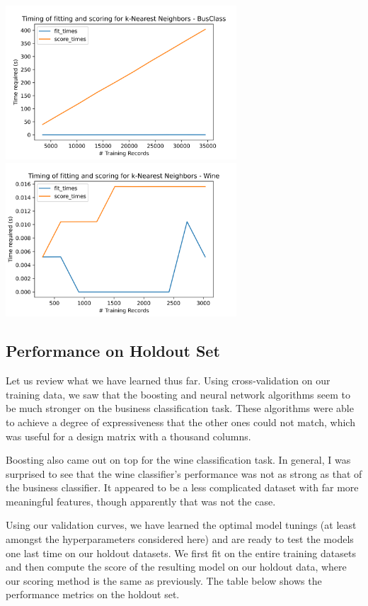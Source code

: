 \documentclass[
	letterpaper, %
]{jdf}
\begin{document}
\includegraphics[width=3.4in]{Figures/BusClass-0920/KNN/time_curve.png}
\includegraphics[width=3.4in]{Figures/Wine-0921/KNN/time_curve.png}

\subsection{Performance on Holdout Set}
Let us review what we have learned thus far. Using cross-validation on our training data, we saw that the boosting and neural network algorithms seem to be much stronger on the business classification task. These algorithms were able to achieve a degree of expressiveness that the other ones could not match, which was useful for a design matrix with a thousand columns.

Boosting also came out on top for the wine classification task. In general, I was surprised to see that the wine classifier's performance was not as strong as that of the business classifier. It appeared to be a less complicated dataset with far more meaningful features, though apparently that was not the case.

Using our validation curves, we have learned the optimal model tunings (at least amongst the hyperparameters considered here) and are ready to test the models one last time on our holdout datasets. We first fit on the entire training datasets and then compute the score of the resulting model on our holdout data, where our scoring method is the same as previously. The table below shows the performance metrics on the holdout set.
\end{document}
